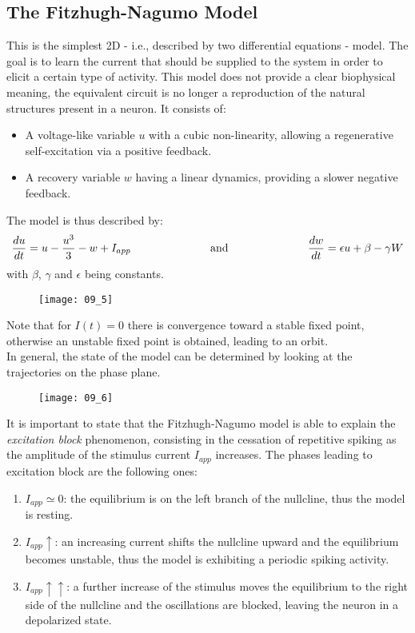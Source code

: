 \subsection{The Fitzhugh-Nagumo Model}
This is the simplest 2D - i.e., described by two differential equations - model. The goal is to learn the
current that should be supplied to the system in order to elicit a certain type of activity. This model
does not provide a clear biophysical meaning, the equivalent circuit is no longer a reproduction of
the natural structures present in a neuron. It consists of:
\begin{itemize}
    \item A voltage-like variable \(u\) with a cubic non-linearity, allowing a regenerative self-excitation
          via a positive feedback.
    \item A recovery variable \(w\) having a linear dynamics, providing a slower negative feedback.
\end{itemize}
The model is thus described by:
\begin{equation*}
    \frac{du}{dt}=u-\frac{u^{3}}{3}-w+I_{app}
    \hspace{2.5cm}
    \text{and}
    \hspace{2.5cm}
    \frac{dw}{dt}=\epsilon{u+\beta-\gamma{W}}
\end{equation*}
with \(\beta\), \(\gamma\) and \(\epsilon\) being constants.
\begin{figure}[H]
    \texttt{[image: 09\_5]}
    \centering
\end{figure}
Note that for \(I(t)=0\) there is convergence toward a stable fixed point, otherwise an unstable
fixed point is obtained, leading to an orbit.\\
In general, the state of the model can be determined by looking at the trajectories on the phase plane.
\begin{figure}[H]
    \texttt{[image: 09\_6]}
    \centering
\end{figure}
It is important to state that the Fitzhugh-Nagumo model is able to explain the \textit{excitation block}
phenomenon, consisting in the cessation of repetitive spiking as the amplitude of the stimulus current
\(I_{app}\) increases. The phases leading to excitation block are the following ones:
\begin{enumerate}
    \item \(I_{app}\simeq{0}\): the equilibrium is on the left branch of the nullcline, thus the
          model is resting.
    \item \(I_{app}\uparrow\): an increasing current shifts the nullcline upward and the equilibrium
          becomes unstable, thus the model is exhibiting a periodic spiking activity.
    \item \(I_{app}\uparrow\uparrow\): a further increase of the stimulus moves the equilibrium to the
          right side of the nullcline and the oscillations are blocked, leaving the neuron in a depolarized state.
\end{enumerate}

